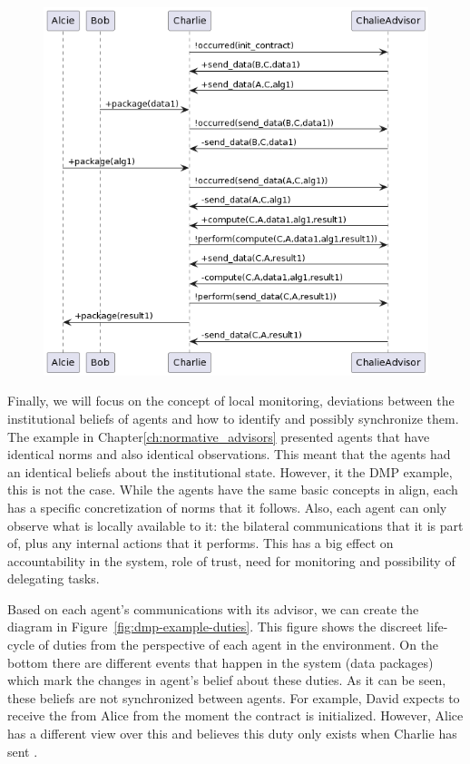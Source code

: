 \begin{figure}[!tbh]
\centering
\includegraphics[width=.66\textwidth]{ch_cmf/market-charlie-seq.png}
  \label{fig:dmp-charlie-seq}
\end{figure}

Finally, we will focus on the concept of local monitoring, deviations between the institutional beliefs of agents and how to identify and possibly synchronize them. The example in Chapter\ref{ch:normative_advisors} presented agents that have identical norms and also identical observations. This meant that the agents had an identical beliefs about the institutional state. However, it the DMP example, this is not the case. While the agents have the same basic concepts in align, each has a specific concretization of norms that it follows. Also, each agent can only observe what is locally available to it: the bilateral communications that it is part of, plus any internal actions that it performs. This has a big effect on accountability in the system, role of trust, need for monitoring and possibility of delegating tasks.

Based on each agent's communications with its advisor, we can create the diagram in Figure~\ref{fig:dmp-example-duties}. This figure shows the discreet life-cycle of duties from the perspective of each agent in the environment. On the bottom there are different events that happen in the system (data packages) which mark the changes in agent's belief about these duties. As it can be seen, these beliefs are not synchronized between agents. For example, David expects to receive the  from Alice from the moment the contract is initialized. However, Alice has a different view over this and believes this duty only exists when Charlie has sent . 


